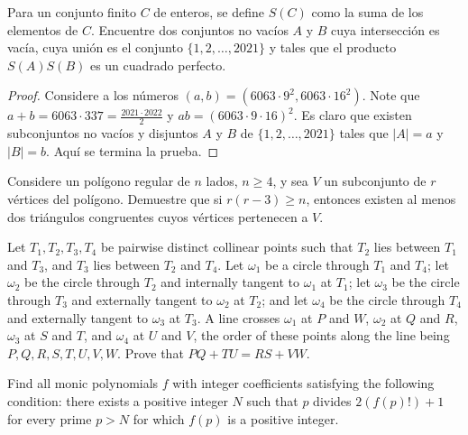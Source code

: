 \begin{probEB}[IberoAmerican 2021/5]
	Para un conjunto finito $C$ de enteros, se define $S(C)$ como la suma de los elementos de $C$. Encuentre dos conjuntos no vacíos $A$ y $B$ cuya intersección es vacía, cuya unión es el conjunto $\{1,2,\dots,2021\}$ y tales que el producto $S(A)S(B)$ es un cuadrado perfecto.
\end{probEB}

\begin{proof}
	Considere a los números $(a,b)=(6063\cdot 9^2,6063\cdot 16^2)$. Note que $a+b=6063\cdot 337=\frac{2021\cdot 2022}{2}$ y $ab=(6063\cdot 9\cdot 16)^2$. Es claro que existen subconjuntos no vacíos y disjuntos $A$ y $B$ de $\{1,2,\dots,2021\}$ tales que $|A|=a$ y $|B|=b$. Aquí se termina la prueba.
\end{proof}

\begin{problem}[IberoAmerican 2021/6]
	Considere un polígono regular de $n$ lados, $n\ge 4$, y sea $V$ un subconjunto de $r$ vértices del polígono. Demuestre que si $r(r-3)\ge n$, entonces existen al menos dos triángulos congruentes cuyos vértices pertenecen a $V$.
\end{problem}

\begin{problem}[RMM 2021/1]
	Let $T_1,T_2,T_3,T_4$ be pairwise distinct collinear points such that $T_2$ lies between $T_1$ and $T_3$, and $T_3$ lies between $T_2$ and $T_4$. Let $\omega_1$ be a circle through $T_1$ and $T_4$; let $\omega_2$ be the circle through $T_2$ and internally tangent to $\omega_1$ at $T_1$; let $\omega_3$ be the circle through $T_3$ and externally tangent to $\omega_2$ at $T_2$; and let $\omega_4$ be the circle through $T_4$ and externally tangent to $\omega_3$ at $T_3$. A line crosses $\omega_1$ at $P$ and $W$, $\omega_2$ at $Q$ and $R$, $\omega_3$ at $S$ and $T$, and $\omega_4$ at $U$ and $V$, the order of these points along the line being $P,Q,R,S,T,U,V,W$. Prove that $PQ+TU=RS+VW$.
\end{problem}

\begin{probEG}[Balkan MO 2016/3]
	Find all monic polynomials $f$ with integer coefficients satisfying the following condition: there exists a positive integer $N$ such that $p$ divides $2(f(p)!)+1$ for every prime $p>N$ for which $f(p)$ is a positive integer.
\end{probEG}

